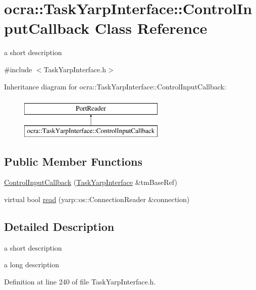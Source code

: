 \hypertarget{classocra_1_1TaskYarpInterface_1_1ControlInputCallback}{}\section{ocra\+:\+:Task\+Yarp\+Interface\+:\+:Control\+Input\+Callback Class Reference}
\label{classocra_1_1TaskYarpInterface_1_1ControlInputCallback}


a short description  




{\ttfamily \#include $<$Task\+Yarp\+Interface.\+h$>$}

Inheritance diagram for ocra\+:\+:Task\+Yarp\+Interface\+:\+:Control\+Input\+Callback\+:\begin{figure}[H]
\begin{center}
\leavevmode
\includegraphics[height=2.000000cm]{de/d1c/classocra_1_1TaskYarpInterface_1_1ControlInputCallback}
\end{center}
\end{figure}
\subsection*{Public Member Functions}
\begin{DoxyCompactItemize}
\item 
\hyperlink{classocra_1_1TaskYarpInterface_1_1ControlInputCallback_aab25b522726df43c6358ac435af4a502}{Control\+Input\+Callback} (\hyperlink{classocra_1_1TaskYarpInterface}{Task\+Yarp\+Interface} \&tm\+Base\+Ref)
\item 
virtual bool \hyperlink{classocra_1_1TaskYarpInterface_1_1ControlInputCallback_a6b2e8af58d4625a70ea6f8217287be07}{read} (yarp\+::os\+::\+Connection\+Reader \&connection)
\end{DoxyCompactItemize}


\subsection{Detailed Description}
a short description 

a long description 

Definition at line 240 of file Task\+Yarp\+Interface.\+h.



